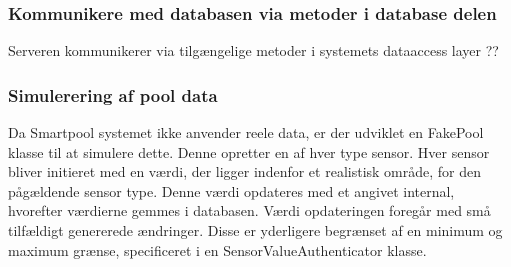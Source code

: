 \subsubsection{Kommunikere med databasen via metoder i database delen}
Serveren kommunikerer via tilgængelige metoder i systemets dataaccess layer ??

\subsubsection{Simulerering af pool data}
Da Smartpool systemet ikke anvender reele data, er der udviklet en FakePool klasse til at simulere dette. Denne opretter en af hver type sensor. Hver sensor bliver initieret med en værdi, der ligger indenfor et realistisk område, for den pågældende sensor type. 
Denne værdi opdateres med et angivet internal, hvorefter værdierne gemmes i databasen. Værdi opdateringen foregår med små tilfældigt genererede ændringer. Disse er yderligere begrænset af en minimum og maximum grænse, specificeret i en SensorValueAuthenticator klasse.  
